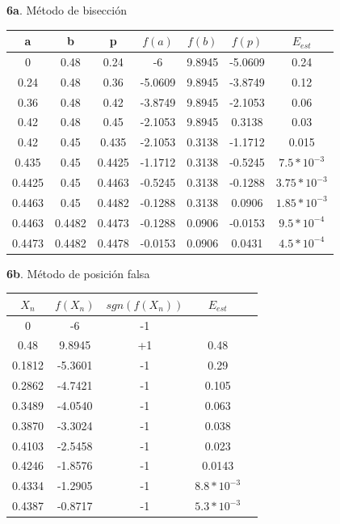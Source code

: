 \documentclass[12pt]{article}
\begin{document}
\textbf{6a}. Método de bisección

\begin{center}
    \begin{tabular}{|c|c|c|c|c|c|c|}
        \hline
        a & b&p&$f(a)$&$f(b)$&$f(p)$&$E_{est}$\\
        \hline
        0 & 0.48&  0.24& -6& 9.8945& -5.0609& 0.24\\
        0.24 & 0.48&  0.36& -5.0609& 9.8945& -3.8749& 0.12\\
        0.36 & 0.48&  0.42& -3.8749& 9.8945& -2.1053& 0.06\\
        0.42 & 0.48&  0.45& -2.1053& 9.8945& 0.3138& 0.03\\
        0.42 &0.45 & 0.435& -2.1053& 0.3138& -1.1712& 0.015\\
        0.435&0.45 &0.4425& -1.1712& 0.3138&  -0.5245& $7.5*10^{-3}$\\
        0.4425&0.45&0.4463& -0.5245& 0.3138& -0.1288& $3.75*10^{-3}$\\
        0.4463&0.45&0.4482& -0.1288& 0.3138& 0.0906& $1.85*10^{-3}$\\
        0.4463&0.4482&0.4473& -0.1288& 0.0906& -0.0153& $9.5*10^{-4}$\\
        0.4473&0.4482&0.4478& -0.0153& 0.0906& 0.0431& $4.5*10^{-4}$\\
        \hline
      \end{tabular} 
\end{center}

\textbf{6b}. Método de posición falsa

\begin{center}
    \begin{tabular}{|c|c|c|c|c|}
        \hline
        $X_n$&$f(X_n)$&$sgn(f(X_n))$&$E_{est}$\\
        \hline
        0        &-6& -1& \\
        0.48     &9.8945&+1&0.48\\
        0.1812  &-5.3601&-1&0.29\\
        0.2862  &-4.7421&-1&0.105\\
        0.3489  &-4.0540&-1&0.063\\
        0.3870  &-3.3024&-1&0.038\\
        0.4103  &-2.5458&-1&0.023\\
        0.4246  &-1.8576&-1&0.0143\\
        0.4334  &-1.2905&-1&$8.8*10^{-3}$\\
        0.4387  &-0.8717&-1&$5.3*10^{-3}$\\
        \hline
      \end{tabular} 
\end{center}
\end{document}
